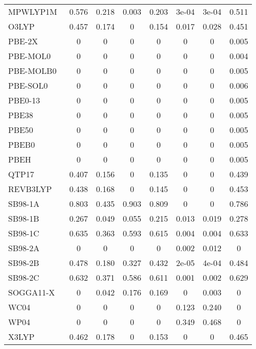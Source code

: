 \begin{table*}
\begin{tabular}{|l|c|c|c|c|c|c|c|}
MPWLYP1M~\cite{Schultz2005_11127} & 0.576 & 0.218 & 0.003 & 0.203 & 3e-04 & 3e-04 & 0.511 \\
O3LYP~\cite{Hoe2001_319,Cohen2001_607} & 0.457 & 0.174 & 0 & 0.154 & 0.017 & 0.028 & 0.451 \\
PBE-2X~\cite{Tahchieva2018_4806} & 0 & 0 & 0 & 0 & 0 & 0 & 0.005 \\
PBE-MOL0~\cite{delCampo2012_104108} & 0 & 0 & 0 & 0 & 0 & 0 & 0.004 \\
PBE-MOLB0~\cite{delCampo2012_104108} & 0 & 0 & 0 & 0 & 0 & 0 & 0.005 \\
PBE-SOL0~\cite{delCampo2012_104108} & 0 & 0 & 0 & 0 & 0 & 0 & 0.006 \\
PBE0-13~\cite{Cortona2012_086101} & 0 & 0 & 0 & 0 & 0 & 0 & 0.005 \\
PBE38~\cite{Grimme2010_154104} & 0 & 0 & 0 & 0 & 0 & 0 & 0.005 \\
PBE50~\cite{Bernard2012_204103} & 0 & 0 & 0 & 0 & 0 & 0 & 0.005 \\
PBEB0~\cite{delCampo2012_104108} & 0 & 0 & 0 & 0 & 0 & 0 & 0.005 \\
PBEH~\cite{Adamo1999_6158,Ernzerhof1999_5029} & 0 & 0 & 0 & 0 & 0 & 0 & 0.005 \\
QTP17~\cite{Jin2018_064111} & 0.407 & 0.156 & 0 & 0.135 & 0 & 0 & 0.439 \\
REVB3LYP~\cite{Lu2013_64} & 0.438 & 0.168 & 0 & 0.145 & 0 & 0 & 0.453 \\
SB98-1A~\cite{Schmider1998_9624} & 0.803 & 0.435 & 0.903 & 0.809 & 0 & 0 & 0.786 \\
SB98-1B~\cite{Schmider1998_9624} & 0.267 & 0.049 & 0.055 & 0.215 & 0.013 & 0.019 & 0.278 \\
SB98-1C~\cite{Schmider1998_9624} & 0.635 & 0.363 & 0.593 & 0.615 & 0.004 & 0.004 & 0.633 \\
SB98-2A~\cite{Schmider1998_9624} & 0 & 0 & 0 & 0 & 0.002 & 0.012 & 0 \\
SB98-2B~\cite{Schmider1998_9624} & 0.478 & 0.180 & 0.327 & 0.432 & 2e-05 & 4e-04 & 0.484 \\
SB98-2C~\cite{Schmider1998_9624} & 0.632 & 0.371 & 0.586 & 0.611 & 0.001 & 0.002 & 0.629 \\
SOGGA11-X~\cite{Peverati2011_191102} & 0 & 0.042 & 0.176 & 0.169 & 0 & 0.003 & 0 \\
WC04~\cite{Wiitala2006_1085} & 0 & 0 & 0 & 0 & 0.123 & 0.240 & 0 \\
WP04~\cite{Wiitala2006_1085} & 0 & 0 & 0 & 0 & 0.349 & 0.468 & 0 \\
X3LYP~\cite{Xu2004_2673} & 0.462 & 0.178 & 0 & 0.153 & 0 & 0 & 0.465 \\
\bottomrule
\end{tabular}
\end{table*}
